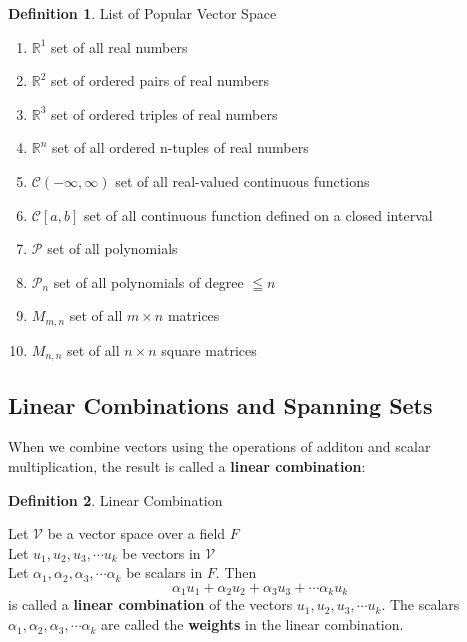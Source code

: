 \documentclass{book}
\theoremstyle{definition}
\newtheorem{definition}{Definition}[section]
\theoremstyle{remark}
\newcommand{\bb}[1]{\mathbb{#1}}
\newcommand{\cc}[1]{\mathcal{#1}}
\begin{document}
\newpage
\begin{definition}
List of Popular Vector Space \\

    \begin{enumerate}
        \item $\bb{R}^1$ set of all real numbers
        \item $\bb{R}^2$ set of ordered pairs of real numbers
        \item $\bb{R}^3$ set of ordered triples of real numbers
        \item $\bb{R}^n$ set of all ordered n-tuples of real numbers
        \item $\mathcal{C}(- \infty, \infty)$ set of all real-valued continuous functions
        \item $\mathcal{C}[a,b]$ set of all continuous function defined on a closed interval
        \item $\mathcal{P}$ set of all polynomials
        \item $\mathcal{P}_n$ set of all polynomials of degree $\leqq n$
        \item $M_{m,n}$ set of all $m \times n$ matrices 
        \item $M_{n,n}$ set of all $n \times n$ square matrices
    \end{enumerate}
\end{definition}


\newpage
\subsection{Linear Combinations and Spanning Sets}

When we combine vectors using the operations of additon and scalar multiplication, the result is called a \textbf{linear combination}:

\begin{definition}
Linear Combination \\

    \begin{tcolorbox}
        Let $\cc{V}$ be a vector space over a field $F$ \\
        Let $u_1, u_2, u_3, \cdots u_k$ be vectors in $\cc{V}$ \\
        Let $\alpha_1, \alpha_2, \alpha_3, \cdots \alpha_k$ be scalars in $F$. Then 
            \begin{equation*}
                \alpha_1 u_1 + \alpha_2 u_2 + \alpha_3 u_3 + \cdots \alpha_k u_k
            \end{equation*}
        is called a \textbf{linear combination} of the vectors $u_1, u_2, u_3, \cdots u_k$. The scalars $\alpha_1, \alpha_2, \alpha_3, \cdots \alpha_k$ are called the \textbf{weights} in the linear combination.  
    \end{tcolorbox}
\end{definition}
\end{document}
